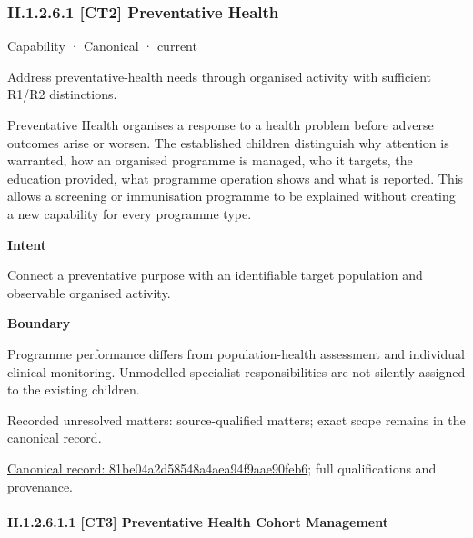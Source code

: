 \subsubsection*{II.1.2.6.1 [CT2] Preventative Health}
\label{navigation:II.1.2.6.1}

\label{element:81be04a2d58548a4aea94f9aae90feb6}
{\small Capability · Canonical · current}\par

Address preventative-health needs through organised activity with sufficient R1/R2 distinctions.



Preventative Health organises a response to a health problem before adverse outcomes arise or worsen. The established children distinguish why attention is warranted, how an organised programme is managed, who it targets, the education provided, what programme operation shows and what is reported. This allows a screening or immunisation programme to be explained without creating a new capability for every programme type.



\textbf{Intent}



Connect a preventative purpose with an identifiable target population and observable organised activity.



\textbf{Boundary}



Programme performance differs from population-health assessment and individual clinical monitoring. Unmodelled specialist responsibilities are not silently assigned to the existing children.


{\small Recorded unresolved matters: source-qualified matters; exact scope remains in the canonical record.}\par
{\footnotesize \href{../../../../continuum/strategy/capability/81be04a2d58548a4aea94f9aae90feb6.md}{Canonical record: 81be04a2d58548a4aea94f9aae90feb6}; full qualifications and provenance.}\par
\paragraph*{II.1.2.6.1.1 [CT3] Preventative Health Cohort Management}
\label{navigation:II.1.2.6.1.1}

